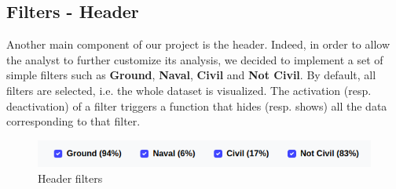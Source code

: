 \subsection{Filters - Header}
Another main component of our project is the header. Indeed, in order to allow the analyst to further customize its analysis, we decided to implement a set of simple filters such as \textbf{Ground}, \textbf{Naval}, \textbf{Civil} and \textbf{Not Civil}. By default, all filters are selected, i.e. the whole dataset is visualized. The activation (resp. deactivation) of a filter triggers a function that hides (resp. shows) all the data corresponding to that filter.
\begin{figure}[h]
\centering
\includegraphics[scale=0.32]{./images/header_filters.png}
\caption{Header filters}
\end{figure}
